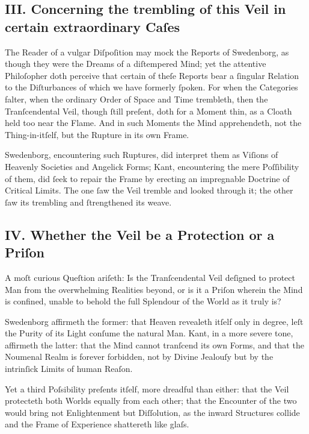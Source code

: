 \documentclass[12pt]{article}
\begin{document}
\subsection*{III. Concerning the trembling of this Veil in certain extraordinary Caſes}

The Reader of a vulgar Diſpoſition may mock the Reports of Swedenborg, as 
though they were the Dreams of a diſtempered Mind; yet the attentive 
Philoſopher doth perceive that certain of theſe Reports bear a ſingular 
Relation to the Diſturbances of which we have formerly ſpoken. For when the 
Categories falter, when the ordinary Order of Space and Time trembleth, then 
the Tranſcendental Veil, though ſtill preſent, doth for a Moment thin, as a 
Cloath held too near the Flame. And in such Moments the Mind apprehendeth, not 
the Thing-in-itſelf, but the Rupture in its own Frame.

Swedenborg, encountering such Ruptures, did interpret them as Viſions of 
Heavenly Societies and Angelick Forms; Kant, encountering the mere Poſſibility 
of them, did ſeek to repair the Frame by erecting an impregnable Doctrine of 
Critical Limits. The one ſaw the Veil tremble and looked through it; the other 
ſaw its trembling and ſtrengthened its weave.

\subsection*{IV. Whether the Veil be a Protection or a Priſon}

A moſt curious Queſtion ariſeth: Is the Tranſcendental Veil deſigned to 
protect Man from the overwhelming Realities beyond, or is it a Priſon 
wherein the Mind is confined, unable to behold the full Splendour of the 
World as it truly is?

Swedenborg affirmeth the former: that Heaven revealeth itſelf only in degree, 
leſt the Purity of its Light conſume the natural Man. Kant, in a more severe 
tone, affirmeth the latter: that the Mind cannot tranſcend its own Forms, and 
that the Noumenal Realm is forever forbidden, not by Divine Jealouſy but by 
the intrinſick Limits of human Reaſon.

Yet a third Poſsibility preſents itſelf, more dreadful than either: that the 
Veil protecteth both Worlds equally from each other; that the Encounter of the 
two would bring not Enlightenment but Diſſolution, as the inward Structures 
collide and the Frame of Experience shattereth like glaſs.
\end{document}
